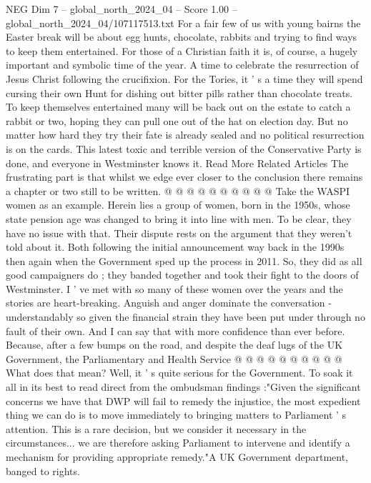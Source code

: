 \begin{textsample}{NEG Dim 7 – global\_north\_2024\_04 – Score 1.00 – global\_north\_2024\_04/107117513.txt}  \label{ex:f7_neg_388}
For a fair few of us with young bairns the Easter break will be about egg hunts, chocolate, rabbits and trying to find ways to keep them entertained.
For those of a Christian faith it is, of course, a hugely important and symbolic time of the year.
A time to celebrate the resurrection of Jesus Christ following the crucifixion.
For the Tories, it ' s a time they will spend cursing their own Hunt for dishing out bitter pills rather than chocolate treats.
To keep themselves entertained many will be back out on the estate to catch a rabbit or two, hoping they can pull one out of the hat on election day.
But no matter how hard they try their fate is already sealed and no political resurrection is on the cards.
This latest toxic and terrible version of the Conservative Party is done, and everyone in Westminster knows it.
Read More Related Articles The frustrating part is that whilst we edge ever closer to the conclusion there remains a chapter or two still to be written. @ @ @ @ @ @ @ @ @ @ Take the WASPI women as an example.
Herein lies a group of women, born in the 1950s, whose state pension age was changed to bring it into line with men.
To be clear, they have no issue with that.
Their dispute rests on the argument that they weren't told about it.
Both following the initial announcement way back in the 1990s then again when the Government sped up the process in 2011.
So, they did as all good campaigners do ; they banded together and took their fight to the doors of Westminster.
I ' ve met with so many of these women over the years and the stories are heart-breaking.
Anguish and anger dominate the conversation - understandably so given the financial strain they have been put under through no fault of their own.
And I can say that with more confidence than ever before.
Because, after a few bumps on the road, and despite the deaf lugs of the UK Government, the Parliamentary and Health Service @ @ @ @ @ @ @ @ @ @ What does that mean?
Well, it ' s quite serious for the Government.
To soak it all in its best to read direct from the ombudsman findings :"Given the significant concerns we have that DWP will fail to remedy the injustice, the most expedient thing we can do is to move immediately to bringing matters to Parliament ' s attention.
This is a rare decision, but we consider it necessary in the circumstances... we are therefore asking Parliament to intervene and identify a mechanism for providing appropriate remedy."A UK Government department, banged to rights.

\end{textsample}
